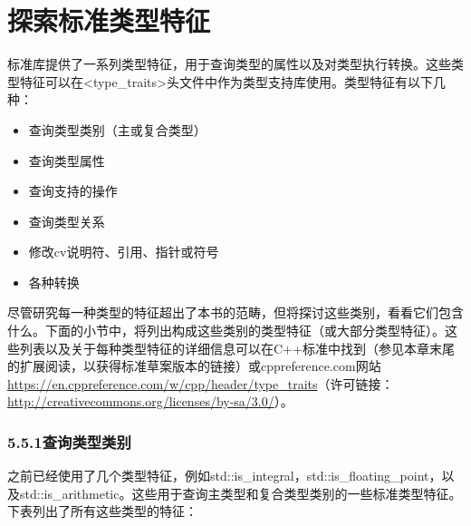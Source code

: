 \section{探索标准类型特征}

标准库提供了一系列类型特征，用于查询类型的属性以及对类型执行转换。这些类型特征可以在<type\_traits>头文件中作为类型支持库使用。类型特征有以下几种：

\begin{itemize}
\item
查询类型类别（主或复合类型）

\item
查询类型属性

\item
查询支持的操作

\item
查询类型关系

\item
修改cv说明符、引用、指针或符号

\item
各种转换
\end{itemize}

尽管研究每一种类型的特征超出了本书的范畴，但将探讨这些类别，看看它们包含什么。下面的小节中，将列出构成这些类别的类型特征（或大部分类型特征）。这些列表以及关于每种类型特征的详细信息可以在C++标准中找到（参见本章末尾的扩展阅读，以获得标准草案版本的链接）或cppreference.com网站\url{https://en.cppreference.com/w/cpp/header/type_traits}（许可链接：\url{http://creativecommons.org/licenses/by-sa/3.0/}）。

\subsubsection{5.5.1\hspace{0.2cm}查询类型类别}

之前已经使用了几个类型特征，例如std::is\_integral，std::is\_floating\_point，以及std::is\_arithmetic。这些用于查询主类型和复合类型类别的一些标准类型特征。下表列出了所有这些类型的特征：

